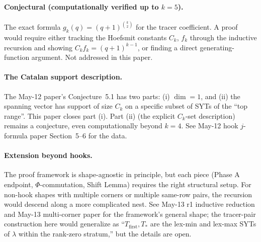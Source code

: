 \documentclass[11pt]{article}
\theoremstyle{definition}
\begin{document}
\paragraph{Conjectural (computationally verified up to $k = 5$).}  The
exact formula $g_k(q) = (q+1)^{\binom{k}{2}}$ for the tracer
coefficient.  A proof would require either tracking the Hoefsmit
constants $C_k$, $f_k$ through the inductive recursion and showing
$C_k f_k = (q+1)^{k-1}$, or finding a direct generating-function
argument.  Not addressed in this paper.

\paragraph{The Catalan support description.}  The May-12 paper's
Conjecture~5.1 has two parts: (i) $\dim = 1$, and (ii) the spanning
vector has support of size $C_k$ on a specific subset of SYTs of the
``top range''.  This paper closes part (i).  Part (ii) (the explicit
$C_k$-set description) remains a conjecture, even computationally
beyond $k = 4$.  See May-12 hook $j$-formula paper Section~5--6 for
the data.

\paragraph{Extension beyond hooks.}  The proof framework is shape-agnostic
in principle, but each piece (Phase A endpoint, $\Phi$-commutation,
Shift Lemma) requires the right structural setup.  For non-hook shapes
with multiple corners or multiple same-row pairs, the recursion would
descend along a more complicated nest.  See May-13 r1 inductive
reduction and May-13 multi-corner paper for the framework's general
shape; the tracer-pair construction here would generalize as
``$T_{\mathrm{first}}, T_{*}$ are the lex-min and lex-max SYTs of $\lambda$
within the rank-zero stratum,'' but the details are open.
\end{document}
